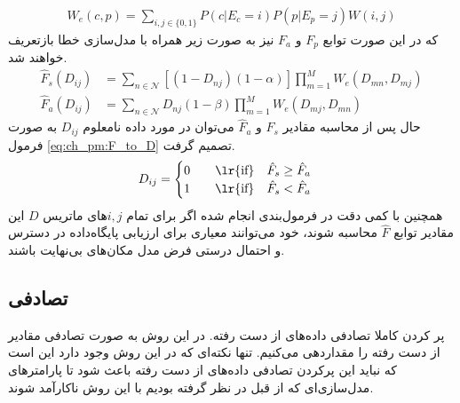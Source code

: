 \begin{equation}
	\begin{aligned}
		W_e(c,p) = \sum_{i,j \in \{0,1\}} P(c|E_c=i)P(p|E_p=j)W(i,j)
	\end{aligned}
	\label{eq:ch_pm:W_e}
\end{equation}
که در این صورت توابع $F_p$ و $F_a$ نیز به صورت زیر همراه با مدل‌سازی خطا بازتعریف خواهند شد.
\begin{equation}
	\begin{aligned}
		\hat{F}_s(D_{ij}) &= \sum_{n \in \mathcal{N}}  [(1-D_{nj})(1-\alpha)]  \prod_{m=1}^{M} W_e(D_{mn}, D_{mj}) \\
		\hat{F}_a(D_{ij}) &= \sum_{n \in \mathcal{N}}  D_{nj}(1-\beta)  \prod_{m=1}^{M} W_e(D_{mj}, D_{mn})
	\end{aligned}
	\label{eq:ch_pm:F_all_final}
\end{equation}
حال پس از محاسبه مقادیر $\hat{F}_s$ و $\hat{F}_a$ می‌توان در مورد داده نامعلوم $D_{ij}$  به صورت فرمول \ref{eq:ch_pm:F_to_D} تصمیم گرفت.
\begin{equation}
	D_{ij} = \begin{cases}
		0 \qquad \text{\lr{if}} \quad \hat{F}_s \ge \hat{F}_a \\
		1 \qquad \text{\lr{if}} \quad \hat{F}_s < \hat{F}_a
	\end{cases}
	\label{eq:ch_pm:F_to_D}
\end{equation}
همچنین با کمی دقت در فرمول‌بندی انجام شده اگر برای تمام $i,j$های ماتریس $D$ این مقادیر توابع $\hat{F}$ محاسبه شوند، خود می‌توانند معیاری برای ارزیابی پایگاه‌داده در دسترس و احتمال درستی فرض مدل مکان‌های بی‌نهایت باشند.



\subsection{تصادفی}
پر کردن کاملا تصادفی داده‌های از دست رفته. در این روش به صورت تصادفی مقادیر از دست رفته را مقداردهی می‌کنیم. تنها نکته‌ای که در این روش وجود دارد این است که نباید این پرکردن تصادفی داده‌های از دست رفته باعث شود تا پارامترهای مدل‌سازی‌ای که از قبل در نظر گرفته بودیم با این روش ناکارآمد شوند.


